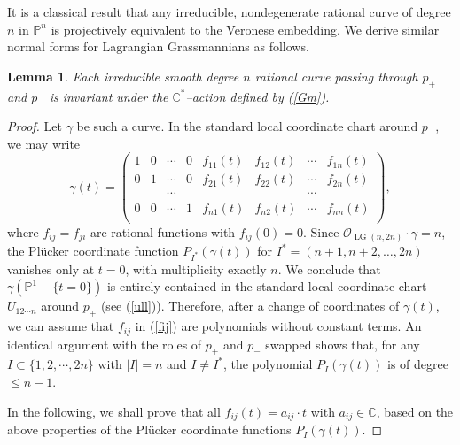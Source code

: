 \documentclass[10pt]{amsart}
\newtheorem{lemma}[theorem]{Lemma}
\theoremstyle{definition}
\newcommand{\LG}{\operatorname{LG}}
\newcommand{\PP}{\mathbb{P}}
\theoremstyle{plain} %
\begin{document}
It is a classical result that any irreducible, nondegenerate rational curve of degree $n$ in $\PP^n$ is projectively equivalent to the Veronese embedding. We derive  similar normal forms for Lagrangian Grassmannians as follows. 
\begin{lemma}\label{2HM}
Each irreducible smooth degree $n$ rational curve passing through $p_+$ and $p_-$ is invariant under the $\mathbb C^*$--action defined by (\ref{Gm}). 

\end{lemma}

\begin{proof}
Let $\gamma$ be such a curve. In the standard local coordinate chart around $p_-$, we may write 
\begin{equation}\label{fij}
\gamma(t)=\begin{pmatrix}
1&0&\cdots&0&f_{11}(t)&f_{12}(t)&\cdots& f_{1n}(t)\\   
0&1&\cdots&0&f_{21}(t)&f_{22}(t)&\cdots& f_{2n}(t)\\ %
&&\cdots&&&&\cdots&\\
0&0&\cdots&1&f_{n1}(t)&f_{n2}(t)&\cdots& f_{nn}(t)\\ 
\end{pmatrix},    
\end{equation}
where $f_{ij}=f_{ji}$ are rational functions with $f_{ij}(0)=0$. Since $\mathcal O_{\LG(n,2n)}\cdot\gamma=n$, the Pl\"ucker coordinate function  $P_{I^*}(\gamma(t))$ for $I^*=(n+1,n+2,\dots,2n)$ vanishes only at $t=0$, with multiplicity exactly $n$. We conclude that $\gamma(\mathbb P^1-\{t=0\})$ is entirely contained in the standard local coordinate chart $U_{12\cdots n}$ around $p_+$ (see (\ref{ull})). Therefore, after a change of coordinates of $\gamma(t)$, we can assume that $f_{ij}$ in (\ref{fij}) are  polynomials without constant terms.
An identical argument with the roles of 
$p_+$ and $p_-$   swapped shows that,  for any $I\subset\{1,2,\cdots,2n\}$ with $|I|=n$ and $I\neq I^*$, the polynomial $P_{I}(\gamma(t))$ is of degree $\leq n-1$. 



In the following, we shall prove that all
$f_{ij}(t)=a_{ij}\cdot t$ with $a_{ij}\in\mathbb C$, based on the above properties of the Pl\"ucker coordinate functions $P_{I}(\gamma(t))$.


\end{proof}
\end{document}
